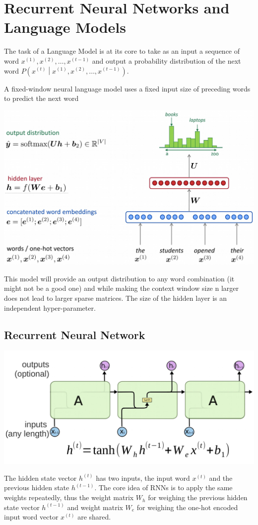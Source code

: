\documentclass[11pt]{article}
\begin{document}
\section{Recurrent Neural Networks and Language Models}
The task of a Language Model is at its core to take as an input a sequence of word $x^{(1)}, x^{(2)}, \dots, x^{(t-1)}$ and output a probability distribution of the next word $P\left( x^{(t)} \middle| x^{(1)}, x^{(2)}, \dots, x^{(t-1)} \right)$.

A fixed-window neural language model uses a fixed input size of preceding words to predict the next word
\begin{center}

	\includegraphics[width=0.6\linewidth]{img/fixed_window_nlm}
\end{center}
This model will provide an output distribution to any word combination (it might not be a good one) and while making the context window size n larger does not lead to larger sparse matrices. The size of the hidden layer is an independent hyper-parameter.

\subsection{Recurrent Neural Network}
\begin{center}
	\includegraphics[width=0.7\linewidth]{img/recurrent_neural_network}
\end{center}
The hidden state vector $h^{(t)}$ has two inputs, the input word $x^{(t)}$ and the previous hidden state $h^{(t-1)}$. The core idea of RNNs is to apply the same weights repeatedly, thus the weight matrix $W_h$ for weighing the previous hidden state vector $h^{(t-1)}$ and weight matrix $W_e$ for weighing the one-hot encoded input word vector $x^{(t)}$ are shared.
\end{document}
